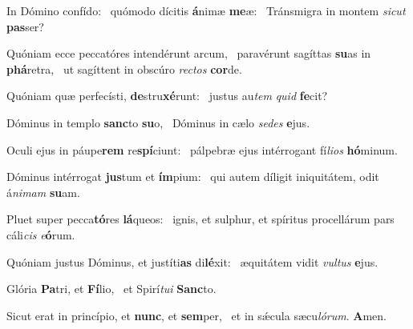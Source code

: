 \item In Dómino confído:~\pscross{} quómodo dícitis \textbf{á}nimæ \textbf{me}æ:~\psstar{} Tránsmigra in montem \textit{sic}\textit{ut} \textbf{pas}ser?
\item Quóniam ecce peccatóres intendérunt arcum,~\pscross{} paravérunt sagíttas \textbf{su}as in \textbf{phá}retra,~\psstar{} ut sagíttent in obscúro \textit{rec}\textit{tos} \textbf{cor}de.
\item Quóniam quæ perfecísti, \textbf{de}stru\textbf{xé}runt:~\psstar{} justus au\textit{tem} \textit{quid} \textbf{fe}cit?
\item Dóminus in templo \textbf{sanc}to \textbf{su}o,~\psstar{} Dóminus in cælo \textit{se}\textit{des} \textbf{e}jus.
\item Oculi ejus in páupe\textbf{rem} re\textbf{spí}ciunt:~\psstar{} pálpebræ ejus intérrogant fí\textit{li}\textit{os} \textbf{hó}minum.
\item Dóminus intérrogat \textbf{jus}tum et \textbf{ím}pium:~\psstar{} qui autem díligit iniquitátem, odit á\textit{ni}\textit{mam} \textbf{su}am.
\item Pluet super pecca\textbf{tó}res \textbf{lá}queos:~\psstar{} ignis, et sulphur, et spíritus procellárum pars cáli\textit{cis} \textit{e}\textbf{ó}rum.
\item Quóniam justus Dóminus, et justíti\textbf{as} di\textbf{lé}xit:~\psstar{} æquitátem vidit \textit{vul}\textit{tus} \textbf{e}jus.
\item Glória \textbf{Pa}tri, et \textbf{Fí}lio,~\psstar{} et Spirí\textit{tu}\textit{i} \textbf{Sanc}to.
\item Sicut erat in princípio, et \textbf{nunc}, et \textbf{sem}per,~\psstar{} et in sǽcula sæcu\textit{ló}\textit{rum}. \textbf{A}men.
